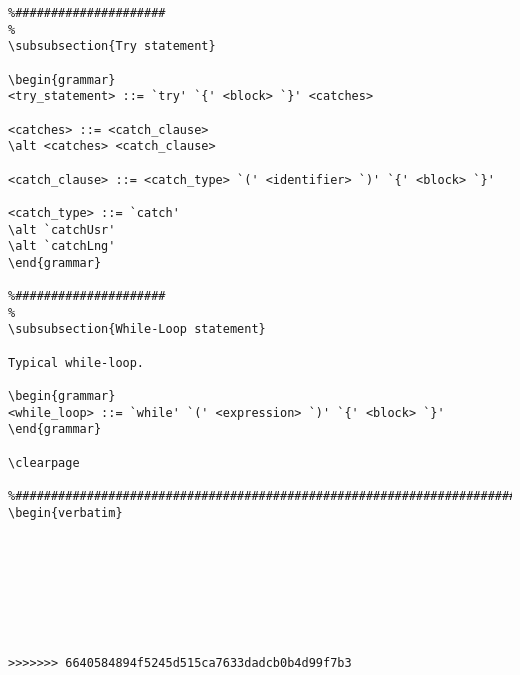 \begin{verbatim}
%#####################
%
\subsubsection{Try statement}

\begin{grammar}
<try_statement> ::= `try' `{' <block> `}' <catches>

<catches> ::= <catch_clause>
\alt <catches> <catch_clause>

<catch_clause> ::= <catch_type> `(' <identifier> `)' `{' <block> `}'

<catch_type> ::= `catch'
\alt `catchUsr'
\alt `catchLng'
\end{grammar}

%#####################
%
\subsubsection{While-Loop statement}

Typical while-loop.

\begin{grammar}
<while_loop> ::= `while' `(' <expression> `)' `{' <block> `}'
\end{grammar}

\clearpage

%####################################################################################
\begin{verbatim}








>>>>>>> 6640584894f5245d515ca7633dadcb0b4d99f7b3
 \end{verbatim}